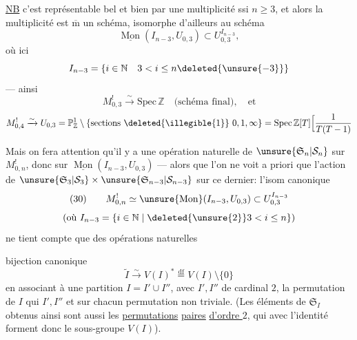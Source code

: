 
\uline{NB} c'est représentable bel et bien par une multiplicité ssi $n\geq3$,  et alors la multiplicité est $\overline{\mathrm m}$ un schéma, isomorphe d'ailleurs  au schéma
\[
\underline{\operatorname{Mon}}(I_{n-3},U_{0,3})\subset U_{0,3}^{I_{n-3}},
\]
où ici
\[
I_{n-3}=\{i\in\mathbb N\quad3<i\leq n\deleted{\unsure{-3}}\}
\]
--- ainsi 
\[
M_{0,3}^{!}\xrightarrow{\sim}\mathrm{Spec}\,\mathbb Z\quad\text{(schéma final)},\quad\text{et}
\]
\[
M_{0,4}^{!}\xrightarrow{\sim}U_{0,3}=\mathbb P^1_{\mathbb Z}\setminus\{\text{sections \deleted{\illegible{1}} }0,1,\infty\}=\mathrm{Spec}\,\mathbb Z[T]\Bigl[\frac{1}{T(T-1)}
\]

Mais on fera attention qu'il y a une opération naturelle de $\unsure{\mathfrak S_n|\mathcal S_n}$ sur $M_{0,n}^{!}$, donc sur $\underline{\operatorname{Mon}}(I_{n-3},U_{0,3})$ ---  alors que l'on ne voit a priori que l'action de $\unsure{\mathfrak S_3|\mathcal S_3}\times\unsure{\mathfrak S_{n-3}|\mathcal S_{n-3}}$ sur ce dernier: l'isom canonique
\[
(30)\qquad M_{0,n}^{!}\simeq\unsure{\operatorname{Mon}}(I_{n-3},U_{0,3})\subset U_{0,3}^{I_{n-3}}
\]
\[
\text{(où }I_{n-3}=\{i\in\mathbb N\mid\deleted{\unsure{2}}3<i\leq n\}\text{)}
\]
ne tient compte que des opérations naturelles 

bijection canonique
\[
\tag{33}
\widetilde I \xrightarrow{\sim} V(I)^*
\overset{\mathrm{df}}{=} V(I)\setminus\{0\}
\]
en associant à une partition $I=I'\cup I''$, avec
$I',I''$ de cardinal $2$, la  permutation
 de $I$
 qui  $I',I''$ et  sur
chacun  permutation non triviale. (Les éléments
de $\mathfrak{S}_I$ obtenus ainsi sont aussi les \uline{permutations}
\uline{paires} \uline{d'ordre $2$}, \deleted{\unsure{)}} qui avec l'identité forment
donc le sous-groupe $V(I)$).

